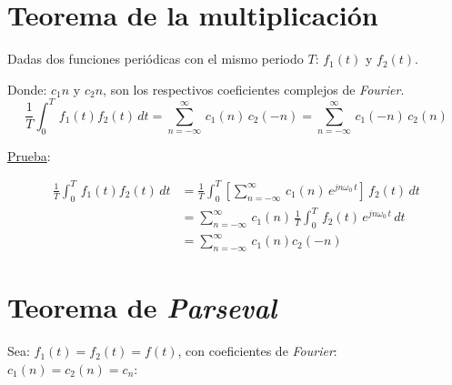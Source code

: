 \section{Teorema de la multiplicación}
Dadas dos funciones periódicas con el mismo periodo $T$: $f_1(t)$ y $f_2(t)$.

Donde: $c_1n$ y $c_2n$, son los respectivos coeficientes complejos de
\emph{Fourier}.
\begin{equation}
    \frac{1}{T}\int_0^T\,f_1(t)f_2(t)\,dt
        =\sum_{n={-\infty}}^\infty\,c_1(n)\,c_2(-n)
        =\sum_{n={-\infty}}^\infty\,c_1(-n)\,c_2(n)
\end{equation}

\underline{Prueba}:

\begin{equation*}
\begin{split}
    \frac{1}{T}\int_0^T\,f_1(t)f_2(t)\,dt
        &=\frac{1}{T}\int_0^T\left[
            \sum_{n={-\infty}}^\infty\,c_1(n)\,e^{jn\omega_0\,t}
        \right]\,f_2(t)\,dt\\
        &=\sum_{n={-\infty}}^\infty\,c_1(n)\,\frac{1}{T}
            \int_0^T\,f_2(t)\,e^{jn\omega_0\,t}\,dt\\
        &=\sum_{n={-\infty}}^\infty\,c_1(n)c_2(-n)
\end{split}
\end{equation*}

\section{Teorema de \emph{Parseval}}
Sea: $f_1(t)=f_2(t)=f(t)$, con coeficientes de \emph{Fourier}:
$c_1(n)=c_2(n)=c_n$:

